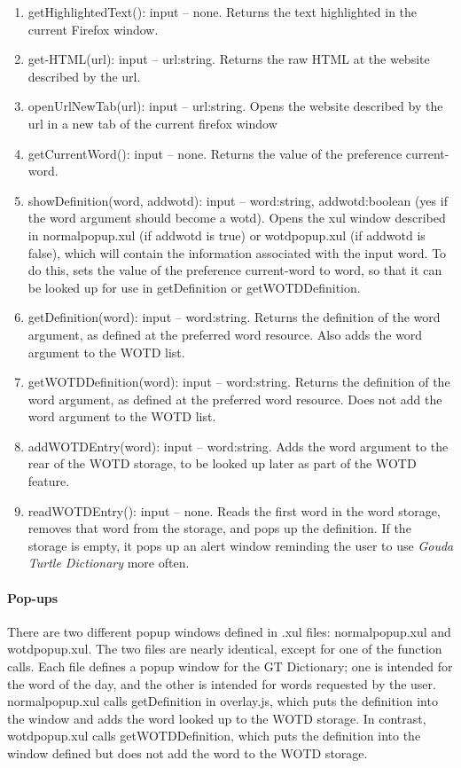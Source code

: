 \documentclass{article}
\begin{document}
\begin{itemize}
\begin{enumerate}
\item getHighlightedText(): input -- none. Returns the text highlighted in the current Firefox window.
\item get-HTML(url): input -- url:string. Returns the raw HTML at the website described by the url.
\item openUrlNewTab(url): input -- url:string. Opens the website described by the url in a new tab of the current firefox window
\item getCurrentWord(): input -- none. Returns the value of the preference current-word.
\item showDefinition(word, addwotd): input -- word:string, addwotd:boolean (yes if the word argument should become a wotd). Opens the xul window described in normalpopup.xul (if addwotd is true) or wotdpopup.xul (if addwotd is false), which will contain the information associated with the input word. To do this, sets the value of the preference current-word to word, so that it can be looked up for use in getDefinition or getWOTDDefinition.
\item getDefinition(word): input -- word:string. Returns the definition of the word argument, as defined at the preferred word resource. Also adds the word argument to the WOTD list.
\item getWOTDDefinition(word): input -- word:string. Returns the definition of the word argument, as defined at the preferred word resource. Does not add the word argument to the WOTD list.
\item addWOTDEntry(word): input -- word:string. Adds the word argument to the rear of the WOTD storage, to be looked up later as part of the WOTD feature.
\item readWOTDEntry(): input -- none. Reads the first word in the word storage, removes that word from the storage, and pops up the definition. If the storage is empty, it pops up an alert window reminding the user to use \emph{Gouda Turtle Dictionary} more often.
\end{enumerate}

\end{itemize}

\paragraph{Pop-ups}

There are two different popup windows defined in .xul files: normalpopup.xul and wotdpopup.xul. The two files are nearly identical, except for one of the function calls. Each file defines a popup window for the GT Dictionary; one is intended for the word of the day, and the other is intended for words requested by the user. normalpopup.xul calls getDefinition in overlay.js, which puts the definition into the window and adds the word looked up to the WOTD storage. In contrast, wotdpopup.xul calls getWOTDDefinition, which puts the definition into the window defined but does not add the word to the WOTD storage.
\end{document}
